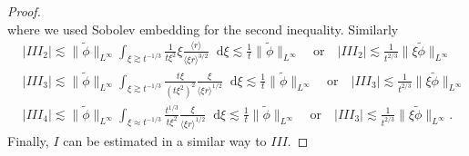 \documentclass[11 pt]{amsart}
\theoremstyle{definition}
\theoremstyle{remark}
\numberwithin{equation}{section}
\newcommand{\dd}{\mathop{}\!\mathrm{d}}
\begin{document}
\begin{proof}
$$$$
where we used Sobolev embedding for the second inequality. Similarly
\begin{align*}
& |III_2| \lesssim \| \widetilde{\phi} \|_{L^\infty} \int_{\xi \gtrsim t^{-1/3}} \frac 1 {t \xi^2} \xi \frac{\langle r \rangle}{\langle \xi r \rangle^{3/2}} \dd \xi \lesssim \frac{1}{t}  \|  \widetilde{\phi} \|_{L^\infty} \quad \mbox{or} \quad  |III_2|\lesssim \frac{1}{t^{2/3}}\| \xi \widetilde{\phi} \|_{L^\infty} \\
& |III_3| \lesssim  \| \widetilde{\phi} \|_{L^\infty} \int_{\xi \gtrsim t^{-1/3}} \frac{t\xi}{(t\xi^2)^2} \frac{\xi}{\langle \xi r \rangle^{1/2}} \dd \xi \lesssim \frac{1}{t}  \|  \widetilde{\phi} \|_{L^\infty}\quad \mbox{or} \quad  |III_3|\lesssim \frac{1}{t^{2/3}}\| \xi \widetilde{\phi} \|_{L^\infty}\\
& |III_4| \lesssim  \| \widetilde{\phi} \|_{L^\infty} \int_{\xi \approx t^{-1/3}} \frac{t^{1/3}}{ t\xi^2} \frac{\xi}{\langle \xi r \rangle^{1/2}} \dd \xi \lesssim \frac{1}{t}  \|  \widetilde{\phi} \|_{L^\infty}\quad \mbox{or} \quad  |III_3|\lesssim \frac{1}{t^{2/3}}\| \xi \widetilde{\phi} \|_{L^\infty}.
\end{align*}
Finally, $I$ can be estimated in a similar way to $III$.

\medskip


\end{proof}
\end{document}
